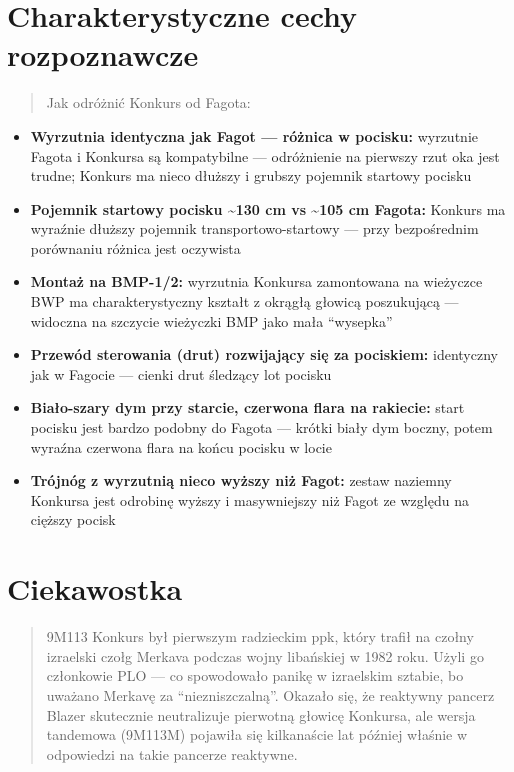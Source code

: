 \documentclass[12pt,openany,oneside]{book}
\providecommand{\tightlist}{%
  \setlength{\itemsep}{0pt}\setlength{\parskip}{0pt}}
\begin{document}
\section{Charakterystyczne cechy
rozpoznawcze}\label{charakterystyczne-cechy-rozpoznawcze-35}

\begin{quote}
Jak odróżnić Konkurs od Fagota:
\end{quote}

\begin{itemize}
\tightlist
\item
  \textbf{Wyrzutnia identyczna jak Fagot --- różnica w pocisku:}
  wyrzutnie Fagota i Konkursa są kompatybilne --- odróżnienie na
  pierwszy rzut oka jest trudne; Konkurs ma nieco dłuższy i grubszy
  pojemnik startowy pocisku
\item
  \textbf{Pojemnik startowy pocisku \textasciitilde130 cm vs
  \textasciitilde105 cm Fagota:} Konkurs ma wyraźnie dłuższy pojemnik
  transportowo-startowy --- przy bezpośrednim porównaniu różnica jest
  oczywista
\item
  \textbf{Montaż na BMP-1/2:} wyrzutnia Konkursa zamontowana na
  wieżyczce BWP ma charakterystyczny kształt z okrągłą głowicą
  poszukującą --- widoczna na szczycie wieżyczki BMP jako mała
  ``wysepka''
\item
  \textbf{Przewód sterowania (drut) rozwijający się za pociskiem:}
  identyczny jak w Fagocie --- cienki drut śledzący lot pocisku
\item
  \textbf{Biało-szary dym przy starcie, czerwona flara na rakiecie:}
  start pocisku jest bardzo podobny do Fagota --- krótki biały dym
  boczny, potem wyraźna czerwona flara na końcu pocisku w locie
\item
  \textbf{Trójnóg z wyrzutnią nieco wyższy niż Fagot:} zestaw naziemny
  Konkursa jest odrobinę wyższy i masywniejszy niż Fagot ze względu na
  cięższy pocisk
\end{itemize}

\section{Ciekawostka}\label{ciekawostka-35}

\begin{quote}
9M113 Konkurs był pierwszym radzieckim ppk, który trafił na czołny
izraelski czołg Merkava podczas wojny libańskiej w 1982 roku. Użyli go
członkowie PLO --- co spowodowało panikę w izraelskim sztabie, bo
uważano Merkavę za ``niezniszczalną''. Okazało się, że reaktywny pancerz
Blazer skutecznie neutralizuje pierwotną głowicę Konkursa, ale wersja
tandemowa (9M113M) pojawiła się kilkanaście lat później właśnie w
odpowiedzi na takie pancerze reaktywne.
\end{quote}
\end{document}
